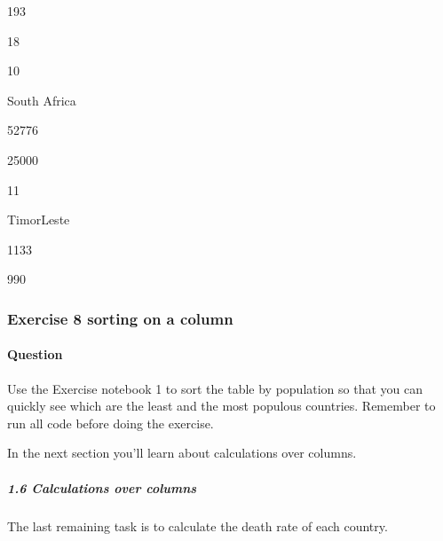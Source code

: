 \documentclass[letterpaper,10pt,english]{sphinxmanual}
\begin{document}
193





18









10





South Africa





52776





25000









11





Timor\sphinxhyphen{}Leste





1133





990










\subsubsection{Exercise 8 sorting on a column}
\label{\detokenize{content/session_02/Part_02_01:Exercise-8-sorting-on-a-column}}

\paragraph{Question}
\label{\detokenize{content/session_02/Part_02_01:id5}}
Use the Exercise notebook 1 to sort the table by population so that you can quickly see which are the least and the most populous countries. Remember to run all code before doing the exercise.

In the next section you’ll learn about calculations over columns.


\subparagraph{1.6 Calculations over columns}
\label{\detokenize{content/session_02/Part_02_01:1.6-Calculations-over-columns}}
The last remaining task is to calculate the death rate of each country.
\end{document}
